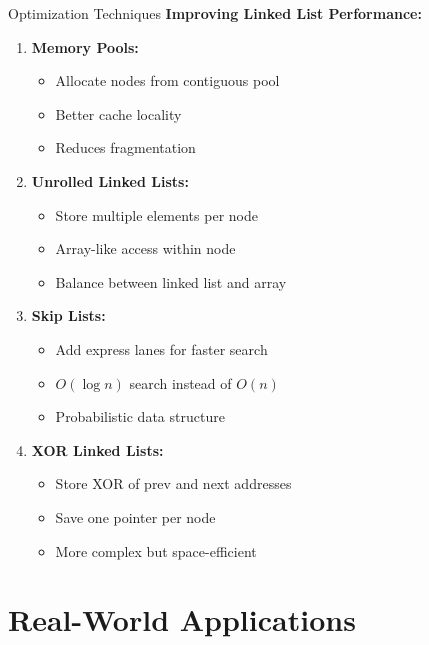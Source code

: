 \documentclass[aspectratio=169,xcolor=dvipsnames]{beamer}
\begin{document}
\begin{frame}{Optimization Techniques}
  \textbf{Improving Linked List Performance:}

  \vspace{0.3cm}
  \begin{enumerate}
    \item \textbf{Memory Pools:}
    \begin{itemize}
      \item Allocate nodes from contiguous pool
      \item Better cache locality
      \item Reduces fragmentation
    \end{itemize}

    \vspace{0.2cm}
    \item \textbf{Unrolled Linked Lists:}
    \begin{itemize}
      \item Store multiple elements per node
      \item Array-like access within node
      \item Balance between linked list and array
    \end{itemize}

    \vspace{0.2cm}
    \item \textbf{Skip Lists:}
    \begin{itemize}
      \item Add express lanes for faster search
      \item $O(\log n)$ search instead of $O(n)$
      \item Probabilistic data structure
    \end{itemize}

    \vspace{0.2cm}
    \item \textbf{XOR Linked Lists:}
    \begin{itemize}
      \item Store XOR of prev and next addresses
      \item Save one pointer per node
      \item More complex but space-efficient
    \end{itemize}
  \end{enumerate}
\end{frame}

\section{Real-World Applications}
\end{document}
